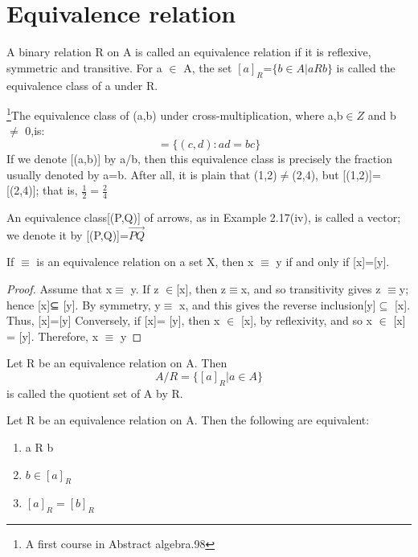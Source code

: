 \documentclass[cn,10pt,math=newtx,citestyle=gb7714-2015,bibstyle=gb7714-2015]{elegantbook}
\begin{document}
\section{Equivalence relation}
\begin{theorem}
A binary relation R on A is called an equivalence
relation if it is reflexive, symmetric and transitive. For a $\in$ A,
the set $[a]_R$=$\{ b \in A | a R b \}$ is called the equivalence class of a under R.
\end{theorem}
\begin{example}
    \footnote{A first course in Abstract algebra.98}The equivalence class of (a,b) under cross-multiplication, where a,b$\in Z$
and b $\neq$ 0,is:
\begin{equation*}
    [(a,b)]=\{(c,d):ad = bc\}
\end{equation*}
If we denote [(a,b)] by a/b, then this equivalence class is precisely the
fraction usually denoted by a=b. After all, it is plain that (1,2)$\neq$(2,4),
but [(1,2)]=[(2,4)]; that is, $\frac{1}{2}=\frac{2}{4}$
\end{example}
\begin{example}
    An equivalence class[(P,Q)] of arrows, as in Example 2.17(iv), is called
a vector; we denote it by [(P,Q)]=$\overrightarrow{PQ}$
\end{example}
\begin{lemma}
If $\equiv$ is an equivalence relation on a set X, then x $\equiv$ y if and
only if [x]=[y].
\end{lemma}

\begin{proof}
    Assume that x$\equiv$ y. If z $\in$[x], then z$\equiv$x, and so transitivity gives
z $\equiv$y; hence [x]⊆ [y]. By symmetry, y$\equiv$ x, and this gives the reverse
inclusion[y]$\subseteq $ [x]. Thus, [x]=[y]
Conversely, if [x]= [y], then x $\in$ [x], by reflexivity, and so x $\in$ [x] = [y].
Therefore, x $\equiv$ y
\end{proof}

\begin{theorem}
    Let R be an equivalence relation on A. Then 
    \begin{equation*}
        A/R=\{[a]_R|a\in A\}
    \end{equation*}
    is called the quotient set of A by R.
\end{theorem}
\begin{theorem}
    Let R be an equivalence relation on A. Then
the following are equivalent:
\begin{enumerate}
    \item a R b
    \item $b\in [a]_R$
    \item $[a]_R=[b]_R$
\end{enumerate}
\end{theorem}
\end{document}
